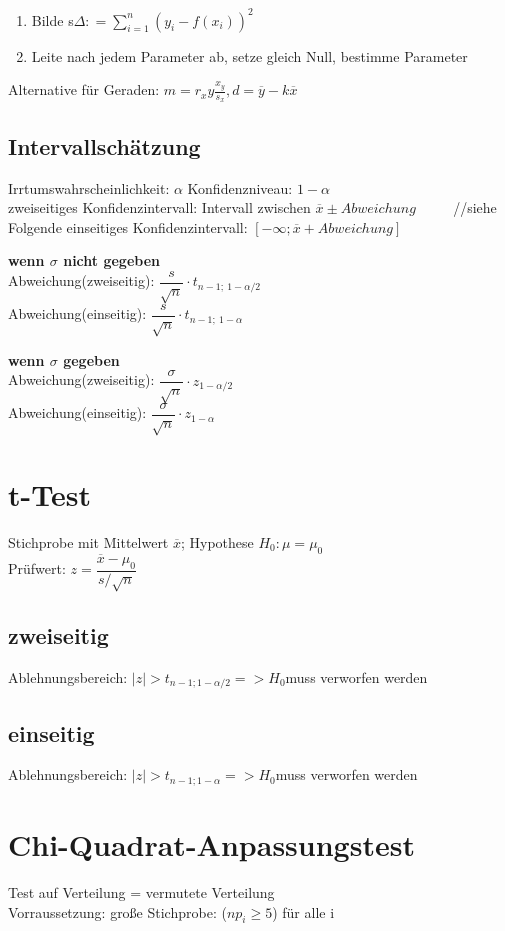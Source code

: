 \begin{enumerate}
\item Bilde s$\Delta : = \sum_{i=1}^n(y_i - f(x_i))^2$
\item Leite nach jedem Parameter ab, setze gleich Null, bestimme Parameter
\end{enumerate}

Alternative für Geraden: $m= r_xy\frac{x_y}{s_x}, d = \overline{y}-k\overline{x}$

\subsection*{Intervallschätzung}
Irrtumswahrscheinlichkeit: $\alpha$ 
Konfidenzniveau: $1-\alpha$\\

zweiseitiges Konfidenzintervall: Intervall zwischen $\overline{x} \pm Abweichung$ ~~~~ //siehe Folgende
einseitiges Konfidenzintervall: $[-\infty; \overline{x} + Abweichung]$

\textbf{wenn $\sigma$ nicht gegeben }\\
Abweichung(zweiseitig): $\dfrac{s}{\sqrt{n}} \cdot t_{n-1;~ 1-\alpha/2}$\\
Abweichung(einseitig): $\dfrac{s}{\sqrt{n}} \cdot t_{n-1;~ 1-\alpha}$

\textbf{wenn $\sigma$ gegeben}\\
Abweichung(zweiseitig): $\dfrac{\sigma}{\sqrt{n}}\cdot  z_{1-\alpha/2}$\\
Abweichung(einseitig): $\dfrac{\sigma}{\sqrt{n}} \cdot z_{1-\alpha}$


\section*{t-Test}
Stichprobe mit Mittelwert $\overline{x}$; Hypothese $H_0: \mu = \mu_0$\\
Prüfwert: $z= \dfrac{\overline{x} - \mu_0}{s/\sqrt{n}}$

\subsection*{zweiseitig}
Ablehnungsbereich: $|z| > t_{n-1;1-\alpha/2} => H_0 $muss verworfen werden 
\subsection*{einseitig}
Ablehnungsbereich: $|z| > t_{n-1;1-\alpha} => H_0 $muss verworfen werden 


\section*{Chi-Quadrat-Anpassungstest}
Test auf Verteilung = vermutete Verteilung\\
Vorraussetzung: große Stichprobe: ($np_i \geq 5$) für alle i

